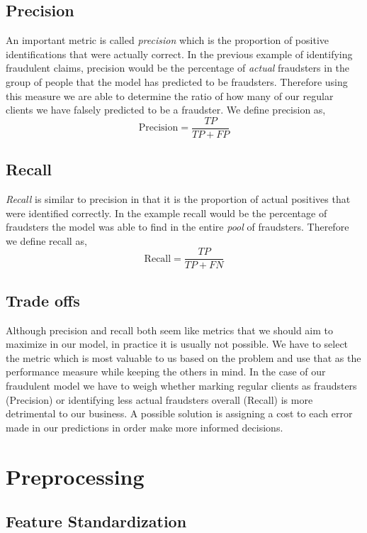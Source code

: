 \subsection{Precision}
An important metric is called \emph{precision} which is the proportion of positive identifications that were actually correct. In the previous example of identifying fraudulent claims, precision would be the percentage of \emph{actual} fraudsters in the group of people that the model has predicted to be fraudsters. Therefore using this measure we are able to determine the ratio of how many of our regular clients we have falsely predicted to be a fraudster. We define precision as,
\begin{equation}
    \mbox{Precision} = \frac{TP}{TP + FP}
\end{equation}
\subsection{Recall}
\emph{Recall} is similar to precision in that it is the proportion of actual positives that were identified correctly. In the example recall would be the percentage of fraudsters the model was able to find in the entire \emph{pool} of fraudsters. Therefore we define recall as,
\begin{equation}
    \mbox{Recall} = \frac{TP}{TP + FN}
\end{equation}
\subsection{Trade offs}
Although precision and recall both seem like metrics that we should aim to maximize in our model, in practice it is usually not possible. We have to select the metric which is most valuable to us based on the problem and use that as the performance measure while keeping the others in mind. In the case of our fraudulent model we have to weigh whether marking regular clients as fraudsters (Precision) or identifying less actual fraudsters overall (Recall) is more detrimental to our business. A possible solution is assigning a cost to each error made in our predictions in order make more informed decisions.
\section{Preprocessing}
\subsection{Feature Standardization}


